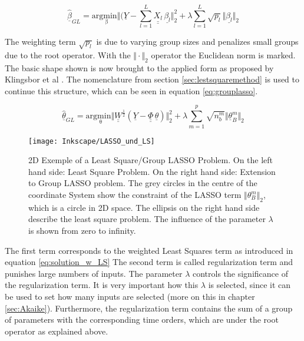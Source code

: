  \begin{equation}
	\hat{\underline{\beta}}_{GL} = \mathrm{arg \underset{\beta} min} \Vert  (\underline{Y} - \sum_{l=1}^L \underline{\underline{X_l}} \, \underline{\beta_l} \Vert^2_2 + \lambda \sum_{l=1}^L \sqrt{p_l} \Vert \underline{\beta_l} \Vert_2
	\label{eq:grouplasso_original}
\end{equation}

The weighting term $\sqrt{p_l}$ is due to varying group sizes and penalizes small groups due to the root operator. With the $\Vert \cdot \Vert_2$ operator the Euclidean norm is marked. The basic shape shown is now brought to the applied form as proposed by Klingsbor et al \cite{Klingspor_2018}. The nomenclature from section \ref{sec:lestsquaremethod} is used to continue this structure, which can be seen in equation \ref{eq:grouplasso}.

 \begin{equation}
	\hat{\underline{\theta}}_{GL} = \mathrm{arg \underset{\theta} min} \Vert \underline{\underline{W}}^{\frac{1}{2}} (\underline{Y}-\underline{\underline{\Phi}} \, \underline{\theta}) \Vert^2_2 + \lambda \sum_{m=1}^p \sqrt{n^m_b} \Vert \underline{\theta}^m_B \Vert_2
	\label{eq:grouplasso}
\end{equation}

\begin{figure}[!htb]
    \centering
    \texttt{[image: Inkscape/LASSO\_und\_LS]} %
    \caption[2D Example Least Square vs. Gruop LASSO]{2D Exemple of a Least Square/Group LASSO Problem. On the left hand side: Least Square Problem. On the right hand side: Extension to Group LASSO problem. The grey circles in the centre of the coordinate System show the constraint of the LASSO term $\Vert \theta^m_B \Vert_2$, which is a circle in 2D space. The ellipsis on the right hand side describe the least square problem. The influence of the parameter $\lambda$ is shown from zero to infinity.}
    \label{fig:2D_LASSO}
\end{figure}

The first term corresponds to the weighted Least Squares term as introduced in equation \ref{eq:solution_w_LS} The second term is called regularization term and punishes large numbers of inputs. The parameter $\lambda$ controls the significance of the regularization term. It is very important how this $\lambda$ is selected, since it can be used to set how many inputs are selected (more on this in chapter \ref{sec:Akaike}). Furthermore, the regularization term contains the sum of a group of parameters with the corresponding time orders, which are under the root operator as explained above.

